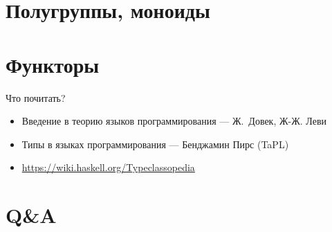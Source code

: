\documentclass{beamer}
\begin{document}
  \section{Полугруппы, моноиды}
  \section{Функторы}
  \begin{frame}{Что почитать?}
      \begin{itemize}
          \item Введение в теорию языков программирования --- Ж.~Довек, Ж-Ж. Леви
          \item Типы в языках программирования --- Бенджамин Пирс (TaPL)
          \item \url{https://wiki.haskell.org/Typeclassopedia}
      \end{itemize}
  \end{frame}
  \section{Q\&A}
\end{document}
